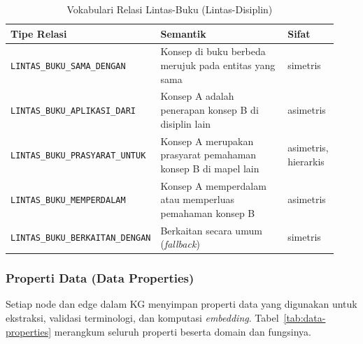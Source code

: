 \documentclass[../../thesis]{subfiles}
\begin{document}
\begin{table}[htbp]
\centering
\caption{Vokabulari Relasi Lintas-Buku (Lintas-Disiplin)}
\label{tab:relasi-lintas-buku}
\begin{tabular}{@{}p{0.38\linewidth}p{0.42\linewidth}p{0.13\linewidth}@{}}
  \toprule
  \textbf{Tipe Relasi} & \textbf{Semantik} & \textbf{Sifat} \\
  \midrule
  \texttt{LINTAS\_BUKU\_SAMA\_DENGAN}
    & Konsep di buku berbeda merujuk pada entitas yang sama
    & simetris \\
  \texttt{LINTAS\_BUKU\_APLIKASI\_DARI}
    & Konsep A adalah penerapan konsep B di disiplin lain
    & asimetris \\
  \texttt{LINTAS\_BUKU\_PRASYARAT\_UNTUK}
    & Konsep A merupakan prasyarat pemahaman konsep B di mapel lain
    & asimetris, hierarkis \\
  \texttt{LINTAS\_BUKU\_MEMPERDALAM}
    & Konsep A memperdalam atau memperluas pemahaman konsep B
    & asimetris \\
  \texttt{LINTAS\_BUKU\_BERKAITAN\_DENGAN}
    & Berkaitan secara umum (\textit{fallback})
    & simetris \\
\end{tabular}
\end{table}

\subsubsection*{Properti Data (Data Properties)}

Setiap node dan edge dalam KG menyimpan properti data yang digunakan
untuk ekstraksi, validasi terminologi, dan komputasi
\textit{embedding}. Tabel~\ref{tab:data-properties} merangkum seluruh
properti beserta domain dan fungsinya.
\end{document}
